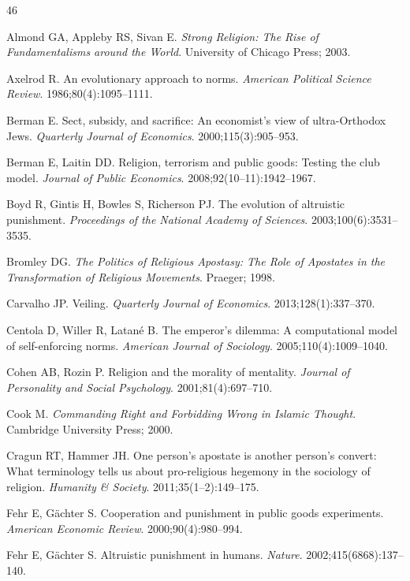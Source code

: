 \documentclass[12pt]{article}
\begin{document}
\begin{thebibliography}{46}

Almond GA, Appleby RS, Sivan E.
\textit{Strong Religion: The Rise of Fundamentalisms around the World}.
University of Chicago Press; 2003.

Axelrod R.
An evolutionary approach to norms.
\textit{American Political Science Review}. 1986;80(4):1095--1111.

Berman E.
Sect, subsidy, and sacrifice: An economist's view of ultra-Orthodox Jews.
\textit{Quarterly Journal of Economics}. 2000;115(3):905--953.

Berman E, Laitin DD.
Religion, terrorism and public goods: Testing the club model.
\textit{Journal of Public Economics}. 2008;92(10--11):1942--1967.

Boyd R, Gintis H, Bowles S, Richerson PJ.
The evolution of altruistic punishment.
\textit{Proceedings of the National Academy of Sciences}. 2003;100(6):3531--3535.

Bromley DG.
\textit{The Politics of Religious Apostasy: The Role of Apostates in the Transformation of Religious Movements}.
Praeger; 1998.

Carvalho JP.
Veiling.
\textit{Quarterly Journal of Economics}. 2013;128(1):337--370.

Centola D, Willer R, Latan\'{e} B.
The emperor's dilemma: A computational model of self-enforcing norms.
\textit{American Journal of Sociology}. 2005;110(4):1009--1040.

Cohen AB, Rozin P.
Religion and the morality of mentality.
\textit{Journal of Personality and Social Psychology}. 2001;81(4):697--710.

Cook M.
\textit{Commanding Right and Forbidding Wrong in Islamic Thought}.
Cambridge University Press; 2000.

Cragun RT, Hammer JH.
One person's apostate is another person's convert: What terminology tells us about pro-religious hegemony in the sociology of religion.
\textit{Humanity \& Society}. 2011;35(1--2):149--175.

Fehr E, G\"{a}chter S.
Cooperation and punishment in public goods experiments.
\textit{American Economic Review}. 2000;90(4):980--994.

Fehr E, G\"{a}chter S.
Altruistic punishment in humans.
\textit{Nature}. 2002;415(6868):137--140.


\end{thebibliography}
\end{document}
